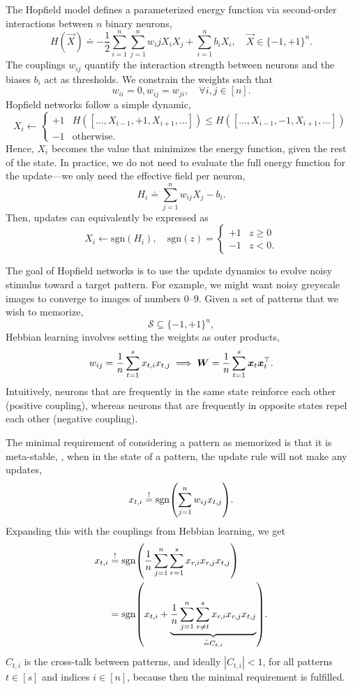 The Hopfield model \citep{hopfield1982neural} defines a parameterized energy function via
second-order interactions between $n$ binary neurons, \[
    H(\vec{X}) \doteq - \frac{1}{2} \sum_{i=1}^{n} \sum_{j=1}^{n} w_ij X_i X_j + \sum_{i=1}^{n} b_i X_i, \quad \vec{X} \in \{ -1, +1 \}^n.
\]
The couplings $w_{ij}$ quantify the interaction strength between neurons and the biases $b_i$ act
as thresholds. We constrain the weights such that \[
    w_{ii} = 0, w_{ij} = w_{ji}, \quad \forall i,j \in [n].
\]
Hopfield networks follow a simple dynamic, \[
    X_i \gets \begin{cases}
        +1 & H([\ldots, X_{i-1}, +1, X_{i+1}, \ldots]) \leq H([\ldots, X_{i-1}, -1, X_{i+1}, \ldots]) \\
        -1 & \text{otherwise}.
    \end{cases}
\]
Hence, $X_i$ becomes the value that minimizes the energy function, given the rest of the state. In
practice, we do not need to evaluate the full energy function for the update---we only need the
effective field per neuron, \[
    H_i \doteq \sum_{j=1}^{n} w_{ij} X_j - b_i.
\]
Then, updates can equivalently be expressed as \[
    X_i \gets \mathrm{sgn}(H_i), \quad \mathrm{sgn}(z) = \begin{cases}
        +1 & z \geq 0 \\
        -1 & z < 0.
    \end{cases}
\]

The goal of Hopfield networks is to use the update dynamics to evolve noisy stimulus toward a
target pattern. For example, we might want noisy greyscale images to converge to images of numbers
$0$--$9$. Given a set of patterns that we wish to memorize, \[
    \mathcal{S} \subseteq \{ -1, +1 \}^n,
\]
Hebbian learning involves setting the weights as outer products, \[
    w_{ij} = \frac{1}{n} \sum_{t=1}^{s} x_{t,i} x_{t,j} \implies \bm{W} = \frac{1}{n} \sum_{t=1}^{s} \bm{x}_t \bm{x}_t^\top.
\]
Intuitively, neurons that are frequently in the same state reinforce each other (positive
coupling), whereas neurons that are frequently in opposite states repel each other (negative
coupling).

The minimal requirement of considering a pattern as memorized is that it is meta-stable, \ie, when
in the state of a pattern, the update rule will not make any updates, \[
    x_{t,i} \condeq \mathrm{sgn} \lft( \sum_{j=1}^{n} w_{ij}x_{t,j} \rgt).
\]
Expanding this with the couplings from Hebbian learning, we get
\begin{align*}
    x_{t,i} & \condeq \mathrm{sgn} \lft( \frac{1}{n} \sum_{j=1}^{n} \sum_{r=1}^{s} x_{r,i} x_{r,j} x_{t,j} \rgt)                                        \\
            & = \mathrm{sgn} \lft( x_{t,i} + \underbrace{\frac{1}{n} \sum_{j=1}^{n} \sum_{r\neq t}^{s} x_{r,i} x_{r,j} x_{t,j}}_{\doteq C_{t,i}} \rgt).
\end{align*}
$C_{t,i}$ is the cross-talk between patterns, and ideally $|C_{t,i}| < 1$, for all patterns $t \in [s]$ and indices $i \in [n]$, because then the minimal requirement is fulfilled.

